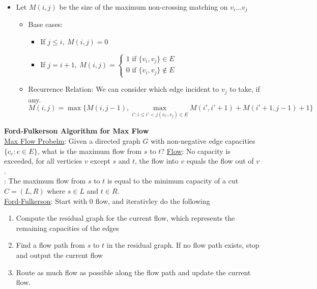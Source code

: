 \documentclass{article}
\begin{document}
\begin{itemize}
    \item Let $M(i, j)$ be the size of the maximum non-crossing matching on $v_i \dots v_j$ \begin{itemize}
        \item Base cases: \begin{itemize}
            \item If $j \leq i,\ M(i, j) = 0$
            \item If $j = i + 1,\ M(i, j) = \begin{cases}
                1 \text{ if } \{v_i, v_j\} \in E \\ 
                0  \text{ if } \{v_i, v_j\} \notin E
            \end{cases}$
        \end{itemize}
        \item Recurrence Relation: We can consider which edge incident to $v_j$ to take, if any. \begin{equation*}
            M(i, j) = \max\{M(i, j - 1),  \max_{i': i\leq i' < j (v_{i'}, v_j) \in E} M(i', i' + 1) + M(i' + 1, j - 1) + 1\}
        \end{equation*}
    \end{itemize}
\end{itemize}
\textbf{Ford-Fulkerson Algorithm for Max Flow} \\[1.0ex]
\underline{Max Flow Probelm}: Given a directed graph $G$ with non-negative edge capacities $\{c_e : e \in E\}$, what is the maximum flow from $s$ to $t$? \underline{Flow}: No capacity is exceeded, for all verticies $v$ except $s$ and $t$, the flow into $v$ equals the flow out of $v$. \\[0.5ex]
: The maximum flow from $s$ to $t$ is equal to the minimum capacity of a cut $C = (L, R)$ where $s \in L$ and $t \in R$. \\[0.5ex]
\underline{Ford-Fulkerson}: Start with 0 flow, and iterativley do the following 
\begin{enumerate}
    \item Compute the residual graph for the current flow, which represents the remaining capacities of the edges 
    \item Find a flow path from $s$ to $t$ in the residual graph. If no flow path exists, stop and output the current flow 
    \item Route as much flow as possible along the flow path and update the current flow.
\end{enumerate}
\end{document}
